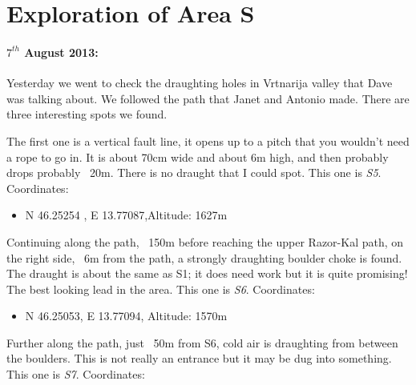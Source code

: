 \section{ Exploration of Area S}

\begin{marginfigure}
\end{marginfigure}
\paragraph{$7^{th}$ August 2013: } Yesterday we went to check the draughting holes in Vrtnarija valley that Dave was talking about. We followed the path that Janet and Antonio made. There are three interesting spots we found.

The first one is a vertical fault line, it opens up to a pitch that you wouldn't need a rope to go in. It is about 70cm wide and about 6m high, and then probably drops probably ~20m. There is no draught that I could spot.
This one is \emph{S5}. Coordinates:

\begin{itemize}
	\item N 46.25254 , E 13.77087,Altitude: 1627m
\end{itemize}


Continuing along the path, ~150m before reaching the upper Razor-Kal path, on the right side, ~6m from the path, a strongly draughting boulder choke is found. The draught is about the same as S1; it does need work but it is quite promising! The best looking lead in the area.
This one is \emph{S6}. Coordinates:

\begin{itemize}
	\item N 46.25053, E 13.77094, Altitude: 1570m
\end{itemize}

Further along the path, just ~50m from S6, cold air is draughting from between the boulders. This is not really an entrance but it may be dug into something. This one is \emph{S7}. Coordinates:


